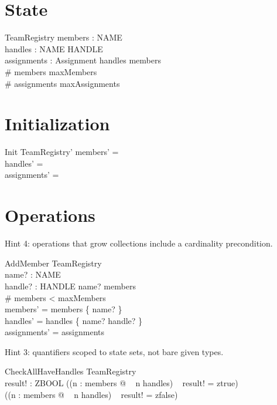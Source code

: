 \documentclass[a4paper,10pt,fleqn]{article}
\begin{document}
\section{State}

\begin{schema}{TeamRegistry}
  members : \finset NAME \\
  handles : NAME \pfun HANDLE \\
  assignments : \finset Assignment
\where
  \dom handles \subseteq members \\
  \# members \leq maxMembers \\
  \# assignments \leq maxAssignments
\end{schema}

\section{Initialization}

\begin{schema}{Init}
  TeamRegistry'
\where
  members' = \emptyset \\
  handles' = \emptyset \\
  assignments' = \emptyset
\end{schema}

\section{Operations}

Hint 4: operations that grow collections include a
cardinality precondition.

\begin{schema}{AddMember}
  \Delta TeamRegistry \\
  name? : NAME \\
  handle? : HANDLE
\where
  name? \notin members \\
  \# members < maxMembers \\
  members' = members \cup \{ name? \} \\
  handles' = handles \cup \{ name? \mapsto handle? \} \\
  assignments' = assignments
\end{schema}

Hint 3: quantifiers scoped to state sets, not bare given
types.

\begin{schema}{CheckAllHaveHandles}
  \Xi TeamRegistry \\
  result! : ZBOOL
\where
  ((\forall n : members @
\quad~ n \in \dom handles)
\quad~ \land result! = ztrue) \\
  \lor (\lnot (\forall n : members @
\quad~ n \in \dom handles)
\quad~ \land result! = zfalse)
\end{schema}
\end{document}
